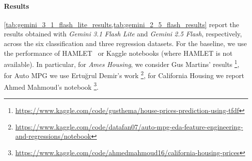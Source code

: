 \documentclass[runningheads]{llncs}
\newcommand{\sidenote}[3]{\todo[linecolor=#1,backgroundcolor=#1!25,bordercolor=#1,size=\tiny]{\textbf{#2:} #3}}
\newcommand{\gcsidenote}[1]{\sidenote{green}{Gio}{#1}}
\begin{document}

\paragraph{Results}
\label{subsec:results}







\cref{tab:gemini_3_1_flash_lite_results,tab:gemini_2_5_flash_results} report
the results obtained with \textit{Gemini 3.1 Flash Lite} and \textit{Gemini 2.5 Flash},
respectively,
across the six classification and three regression datasets.
%
For the baseline,
we use the performance of HAMLET~\cite{FranciaGP23} or Kaggle notebooks (where HAMLET is not available).
%
In particular,
for \textit{Ames Housing},
we consider Gus Martins' results%
\footnote{\url{https://www.kaggle.com/code/gusthema/house-prices-prediction-using-tfdf}},
for Auto MPG we use Ertu\u{g}rul Demir's work%
\footnote{\url{https://www.kaggle.com/code/datafan07/auto-mpg-eda-feature-engineering-and-regressions/notebook}},
for California Housing we report Ahmed Mahmoud's notebook%
\footnote{\url{https://www.kaggle.com/code/ahmedmahmoud16/california-housing-prices}}.
\end{document}
